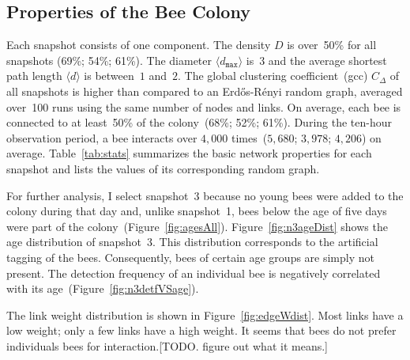 \subsection{Properties of the Bee Colony}
\label{subsec:colony}
Each snapshot consists of one component.
The density $D$ is over~50\% for all snapshots (69\%; 54\%; 61\%).
The diameter $\langle d_{\texttt{max}} \rangle$ is~$3$ and the average shortest path length $\langle d \rangle$ is between~$1$ and~$2$.
The global clustering coefficient~(gcc) $C_\Delta$ of all snapshots is higher than compared to an Erd\H{o}s-R\'{e}nyi random graph, averaged over~100 runs using the same number of nodes and links.
On average, each bee is connected to at least~50\% of the colony~(68\%; 52\%; 61\%).
During the ten-hour observation period, a bee interacts over $4,000$ times~($5,680$; $3,978$; $4,206$) on average.
Table~\ref{tab:stats} summarizes the basic network properties for each snapshot and lists the values of its corresponding random graph.

For further analysis, I select snapshot~3 because no young bees were added to the colony during that day and, unlike snapshot~1, bees below the age of five days were part of the colony~(Figure~\ref{fig:agesAll}).
Figure~\ref{fig:n3ageDist} shows the age distribution of snapshot~3.
This distribution corresponds to the artificial tagging of the bees.
Consequently, bees of certain age groups are simply not present.
The detection frequency of an individual bee is negatively correlated with its age~(Figure~\ref{fig:n3detfVSage}).


The link weight distribution is shown in Figure~\ref{fig:edgeWdist}.
Most links have a low weight; only a few links have a high weight.
It seems that bees do not prefer individuals bees for interaction.[TODO. figure out what it means.]



